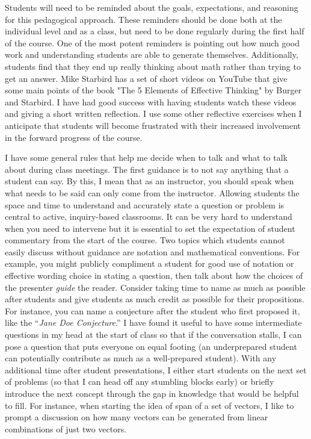 \begin{annotation}
Students will need to be reminded  about the goals, expectations, and reasoning for this pedagogical approach. These reminders should be done both at the individual level and as a class, but need to be done regularly during the first half of the course. One of the most potent reminders is pointing out how much good work and understanding students are able to generate themselves. Additionally, students find that they end up really thinking about math rather than trying to get an answer. Mike Starbird has a set of short videos on YouTube that give some main points of the book "The 5 Elements of Effective Thinking" by Burger and Starbird. I have had good success with having students watch these videos and giving a short written reflection. I use  some other reflective exercises when I anticipate that students will become frustrated with their increased involvement in the forward progress of the course.

I have some general rules that help me  decide when to talk and what to talk about during class meetings. The first guidance is to not say anything that a student can say. By this, I mean that as an instructor, you should speak when what needs to be said can only come from the instructor. Allowing students the space and time to understand and accurately state a question or problem is central to active, inquiry-based classrooms. It can be very hard to understand when you need to intervene but it is essential to set the expectation of  student commentary from the start of the course. Two topics which students cannot easily discuss without guidance are notation and mathematical conventions. For example, you might publicly compliment a student  for good use of notation or effective wording choice in stating  a question, then talk about how the choices of the presenter \emph{guide} the reader. Consider  taking time to name as much as possible after students and give students as much credit as possible for their propositions. For instance, you can name a conjecture after the student who first proposed it, like the “\emph{Jane Doe Conjecture}.” I have found it useful to have some intermediate questions in my head at the start of class so that if the conversation stalls, I can pose a question that puts everyone on equal footing (an underprepared student can potentially contribute as much as a well-prepared student). With any additional time after student presentations, I either start students  on the next set of problems (so that I can head off any stumbling blocks early) or briefly introduce the next concept through the gap in knowledge that would be helpful to fill. For instance, when starting the idea of span of a set of vectors, I like to prompt a discussion on how many vectors can be generated from linear combinations of just two vectors.



\end{annotation}
